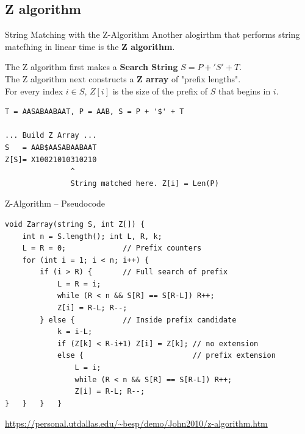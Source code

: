 \subsection{Z algorithm}

\begin{frame}[fragile]{String Matching with the Z-Algorithm}
  Another alogirthm that performs string matcfhing in linear time is the {\bf Z algorithm}.\bigskip

  The Z algorithm first makes a {\bf Search String} $S = P + 'S' + T$.\\
  The Z algorithm next constructs a {\bf Z array} of "prefix lengths".\\
  For every index $i\in S$, $Z[i]$ is the size of the prefix of $S$ that begins in $i$.\bigskip

\begin{verbatim}
T = AASABAABAAT, P = AAB, S = P + '$' + T

... Build Z Array ...
S   = AAB$AASABAABAAT
Z[S]= X10021010310210
               ^
               String matched here. Z[i] = Len(P)
\end{verbatim}
\end{frame}

\begin{frame}[fragile]{Z-Algorithm -- Pseudocode}
  \begin{block}{}
{\smaller
\begin{verbatim}
void Zarray(string S, int Z[]) {
    int n = S.length(); int L, R, k;
    L = R = 0;             // Prefix counters
    for (int i = 1; i < n; i++) {
        if (i > R) {       // Full search of prefix
            L = R = i;
            while (R < n && S[R] == S[R-L]) R++;
            Z[i] = R-L; R--;
        } else {           // Inside prefix candidate
            k = i-L;
            if (Z[k] < R-i+1) Z[i] = Z[k]; // no extension
            else {                         // prefix extension
                L = i;
                while (R < n && S[R] == S[R-L]) R++;
                Z[i] = R-L; R--;
}   }   }   }
\end{verbatim}}
  \end{block}

{
\url{https://personal.utdallas.edu/~besp/demo/John2010/z-algorithm.htm}}

\end{frame}

